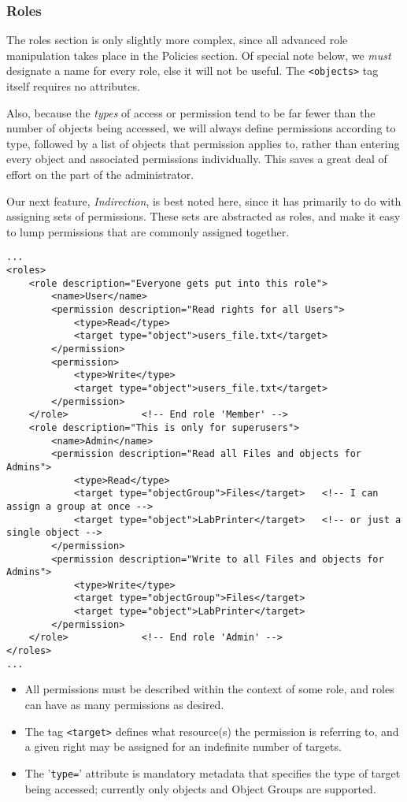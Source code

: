 \documentclass{article}
\providecommand{\tightlist}{
    \setlength{\itemsep}{1pt}\setlength{\parskip}{0pt}
}
\providecommand{\inlinecode}{\texttt}
\begin{document}
\subsubsection{Roles}
The roles section is only slightly more complex, since all advanced role manipulation takes place in the Policies section. Of special note below, we \textit{must} designate a name for every role, else it will not be useful. The \inlinecode{<objects>} tag itself requires no attributes. \par
Also, because the \textit{types} of access or permission tend to be far fewer than the number of objects being accessed, we will always define permissions according to type, followed by a list of objects that permission applies to, rather than entering every object and associated permissions individually. This saves a great deal of effort on the part of the administrator. \par
Our next feature, \textit{Indirection}, is best noted here, since it has primarily to do with assigning sets of permissions. These sets are abstracted as roles, and make it easy to lump permissions that are commonly assigned together.

\begin{lstlisting}
...
<roles>
    <role description="Everyone gets put into this role">
        <name>User</name>
        <permission description="Read rights for all Users">
            <type>Read</type>
            <target type="object">users_file.txt</target>
        </permission>
        <permission>
            <type>Write</type>
            <target type="object">users_file.txt</target>
        </permission>
    </role>             <!-- End role 'Member' -->
    <role description="This is only for superusers">
        <name>Admin</name>
        <permission description="Read all Files and objects for Admins">
            <type>Read</type>
            <target type="objectGroup">Files</target>   <!-- I can assign a group at once -->
            <target type="object">LabPrinter</target>   <!-- or just a single object -->
        </permission>
        <permission description="Write to all Files and objects for Admins">
            <type>Write</type>
            <target type="objectGroup">Files</target>
            <target type="object">LabPrinter</target>
        </permission>
    </role>             <!-- End role 'Admin' -->
</roles>
...
\end{lstlisting}
\begin{itemize}\tightlist
  \item All permissions must be described within the context of some role, and roles can have as many permissions as desired.
  \item The tag \inlinecode{<target>} defines what resource(s) the permission is referring to, and a given right may be assigned for an indefinite number of targets.
  \item The '\inlinecode{type=}' attribute is mandatory metadata that specifies the type of target being accessed; currently only objects and Object Groups are supported.
\end{itemize}
\end{document}
